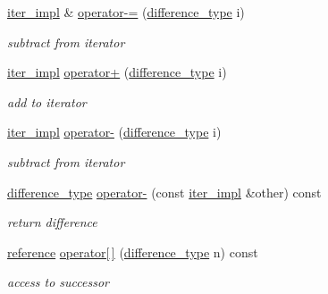 \begin{DoxyCompactItemize}
\hyperlink{classnlohmann_1_1basic__json_1_1iter__impl}{iter\+\_\+impl} \& \hyperlink{classnlohmann_1_1basic__json_1_1iter__impl_aa54abe1de54f9f7c8a05e8df0575b4de}{operator-\/=} (\hyperlink{classnlohmann_1_1basic__json_1_1iter__impl_a088519ca37ae2be2c1f1bbc4868dc878}{difference\+\_\+type} i)
\begin{DoxyCompactList}\small\item\em subtract from iterator \end{DoxyCompactList}\item 
\hyperlink{classnlohmann_1_1basic__json_1_1iter__impl}{iter\+\_\+impl} \hyperlink{classnlohmann_1_1basic__json_1_1iter__impl_a79fc61904fd502bd2808c2dfb2c9d532}{operator+} (\hyperlink{classnlohmann_1_1basic__json_1_1iter__impl_a088519ca37ae2be2c1f1bbc4868dc878}{difference\+\_\+type} i)
\begin{DoxyCompactList}\small\item\em add to iterator \end{DoxyCompactList}\item 
\hyperlink{classnlohmann_1_1basic__json_1_1iter__impl}{iter\+\_\+impl} \hyperlink{classnlohmann_1_1basic__json_1_1iter__impl_a2e63d6497a2412467ebd0aff63018c2f}{operator-\/} (\hyperlink{classnlohmann_1_1basic__json_1_1iter__impl_a088519ca37ae2be2c1f1bbc4868dc878}{difference\+\_\+type} i)
\begin{DoxyCompactList}\small\item\em subtract from iterator \end{DoxyCompactList}\item 
\hyperlink{classnlohmann_1_1basic__json_1_1iter__impl_a088519ca37ae2be2c1f1bbc4868dc878}{difference\+\_\+type} \hyperlink{classnlohmann_1_1basic__json_1_1iter__impl_acb3665326bb9203a581b91f2490cea23}{operator-\/} (const \hyperlink{classnlohmann_1_1basic__json_1_1iter__impl}{iter\+\_\+impl} \&other) const 
\begin{DoxyCompactList}\small\item\em return difference \end{DoxyCompactList}\item 
\hyperlink{classnlohmann_1_1basic__json_1_1iter__impl_a0e391c9035a242461d131b2dc0314256}{reference} \hyperlink{classnlohmann_1_1basic__json_1_1iter__impl_a737f9dbfbdfa38acde81b30e7b0dd1f1}{operator\mbox{[}$\,$\mbox{]}} (\hyperlink{classnlohmann_1_1basic__json_1_1iter__impl_a088519ca37ae2be2c1f1bbc4868dc878}{difference\+\_\+type} n) const 
\begin{DoxyCompactList}\small\item\em access to successor \end{DoxyCompactList}\item 

\end{DoxyCompactItemize}
